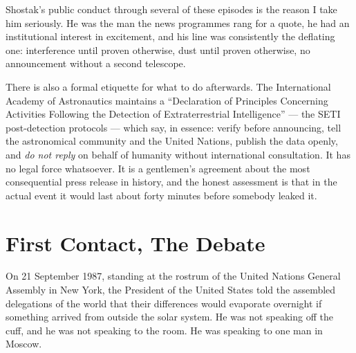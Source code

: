 Shostak's public conduct through several of these episodes is the reason I take him seriously. He was
the man the news programmes rang for a quote, he had an institutional interest in excitement, and his
line was consistently the deflating one: interference until proven otherwise, dust until proven
otherwise, no announcement without a second telescope. 

\begin{funfact}
There is also a formal etiquette for what to do afterwards. The International Academy of Astronautics
maintains a ``Declaration of Principles Concerning Activities Following the Detection of
Extraterrestrial Intelligence'' --- the SETI post-detection protocols --- which say, in essence:
verify before announcing, tell the astronomical community and the United Nations, publish the data
openly, and \emph{do not reply} on behalf of humanity without international consultation. It has no
legal force whatsoever. It is a gentlemen's agreement about the most consequential press release in
history, and the honest assessment is that in the actual event it would last about forty minutes
before somebody leaked it.
\end{funfact}

\section{First Contact, The Debate}\label{sec:firstcontactdebate}

On 21 September 1987, standing at the rostrum of the United Nations General Assembly in New York,
the President of the United States told the assembled delegations of the world that their
differences would evaporate overnight if something arrived from outside the solar system. He was
not speaking off the cuff, and he was not speaking to the room. He was speaking to one man in
Moscow.


